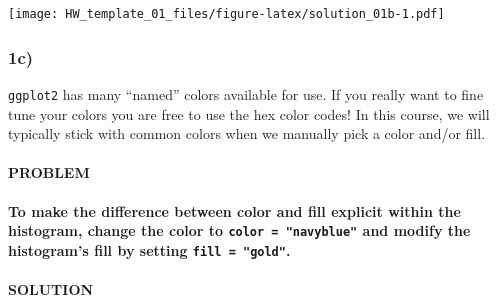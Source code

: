 \documentclass[]{article}
\newenvironment{Shaded}{\begin{snugshade}}{\end{snugshade}}
\newcommand{\CommentTok}[1]{\textcolor[rgb]{0.56,0.35,0.01}{\textit{#1}}}
\newcommand{\DataTypeTok}[1]{\textcolor[rgb]{0.13,0.29,0.53}{#1}}
\newcommand{\DecValTok}[1]{\textcolor[rgb]{0.00,0.00,0.81}{#1}}
\newcommand{\KeywordTok}[1]{\textcolor[rgb]{0.13,0.29,0.53}{\textbf{#1}}}
\newcommand{\NormalTok}[1]{#1}
\newcommand{\OperatorTok}[1]{\textcolor[rgb]{0.81,0.36,0.00}{\textbf{#1}}}
\newcommand{\StringTok}[1]{\textcolor[rgb]{0.31,0.60,0.02}{#1}}
\let\oldparagraph\paragraph
\renewcommand{\paragraph}[1]{\oldparagraph{#1}\mbox{}}
\begin{document}
\begin{Shaded}
\end{Shaded}

\texttt{[image: HW\_template\_01\_files/figure-latex/solution\_01b-1.pdf]}

\hypertarget{c}{%
\subsubsection{1c)}\label{c}}

\texttt{ggplot2} has many ``named'' colors available for use. If you
really want to fine tune your colors you are free to use the hex color
codes! In this course, we will typically stick with common colors when
we manually pick a color and/or fill.

\hypertarget{problem-3}{%
\paragraph{PROBLEM}\label{problem-3}}

\textbf{To make the difference between color and fill explicit within
the histogram, change the color to \texttt{color\ =\ "navyblue"} and
modify the histogram's fill by setting \texttt{fill\ =\ "gold"}.}

\hypertarget{solution-2}{%
\paragraph{SOLUTION}\label{solution-2}}

\begin{Shaded}
\end{Shaded}
\end{document}
